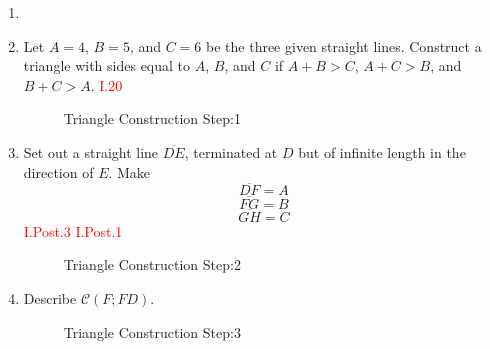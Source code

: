 \documentclass{book}
\begin{document}
\begin{enumerate}

\item[]

\item Let $A = 4$, $B = 5$, and $C = 6$ be the three given straight lines. Construct a triangle with sides equal to $A$, $B$, and $C$ if $A + B > C$, $A + C > B$, and $B + C > A$. \hfill\textcolor{red}{I.20}

\begin{figure}[H]
\centering
	\caption{Triangle Construction Step:1}
\end{figure}

\item Set out a straight line $\overline{DE}$, terminated at $D$ but of infinite length in the direction of $E$. Make 
\[\overline{DF} = A\]
\[\overline{FG} = B\]  
\[\overline{GH} = C\] \hfill\textcolor{red}{I.Post.3 I.Post.1}

\vspace{2cm}

\begin{figure}[H]
\centering
	\caption{Triangle Construction Step:2}
\end{figure}

\clearpage

\item Describe $\mathscr{C}(F;FD)$. 

\begin{figure}[H]
\centering
	\caption{Triangle Construction Step:3}
\end{figure}


\end{enumerate}
\end{document}

